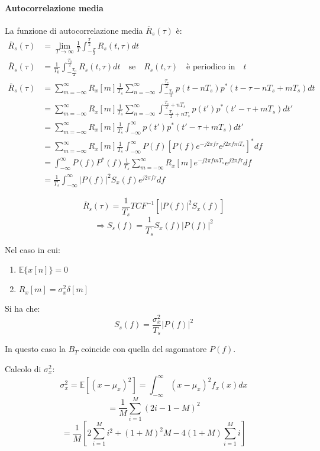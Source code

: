 \documentclass{article}
\begin{document}
\paragraph*{Autocorrelazione media}

La funzione di autocorrelazione media \( \overline{R}_s(\tau) \) è:
\begin{align*}
\overline{R}_s(\tau) &= \lim_{T\to\infty} \frac{1}{T} \int_{-\frac{T}{2}}^{\frac{T}{2}} R_s(t, \tau) dt \\
\overline{R}_s(\tau) &= \frac{1}{T_0} \int_{-\frac{T_0}{2}}^{\frac{T_0}{2}} R_s(t,\tau)dt \quad \text{se} \quad R_s(t,\tau) \quad \text{è periodico in} \quad t \\
\overline{R}_s(\tau) &= \sum_{m=-\infty}^{\infty} R_x[m] \frac{1}{T_s} \sum_{n=-\infty}^{\infty} \int_{-\frac{T_s}{2}}^{\frac{T_s}{2}} p(t-nT_s)p^*(t-\tau-nT_s+mT_s)dt \\
&= \sum_{m=-\infty}^{\infty} R_x[m] \frac{1}{T_s} \sum_{n=-\infty}^{\infty}\int_{-\frac{T_s}{2}+nT_s}^{\frac{T_s}{2}+nT_s} p(t')p^*(t'-\tau+mT_s)dt' \\
&= \sum_{m=-\infty}^{\infty} R_x[m] \frac{1}{T_s} \int_{-\infty}^{\infty} p(t')p^*(t'-\tau+mT_s)dt' \\
&= \sum_{m=-\infty}^{\infty} R_x[m] \frac{1}{T_s} \int_{-\infty}^{\infty} P(f)[P(f)e^{-j2\pi f\tau}e^{j2\pi fmT_s}]^*df \\
&= \int_{-\infty}^{\infty} P(f)P^*(f)\frac{1}{T_s} \sum_{m=-\infty}^{\infty} R_x[m] e^{-j2\pi fmT_s}e^{j2\pi f\tau}df \\
&= \frac{1}{T_s} \int_{-\infty}^{\infty} |P(f)|^2 S_x(f)e^{j2\pi f\tau}df
\end{align*}


\[
\overline{R}_s(\tau) = \frac{1}{T_s} TCF^{-1} \left[ |P(f)|^2 S_x(f) \right]
\]
\[
\Rightarrow S_s(f) = \frac{1}{T_s} S_x(f) |P(f)|^2
\]

Nel caso in cui:
\begin{enumerate}
  \item $\mathbb{E} \{ x[n] \} = 0$
  \item $R_x[m] = \sigma_x^2 \delta[m]$
\end{enumerate}

Si ha che:
\[
S_s(f) = \frac{\sigma_x^2}{T_s} |P(f)|^2
\]

In questo caso la $B_T$ coincide con quella del sagomatore $P(f)$.

Calcolo di $\sigma_x^2$:
\[
\sigma_x^2 = \mathbb{E} \left[ (x - \mu_x)^2 \right] = \int_{-\infty}^{\infty} (x - \mu_x)^2 f_x(x) dx
\]
\[
= \frac{1}{M} \sum_{i=1}^{M} (2i - 1 - M)^2
\]
\[
= \frac{1}{M} \left[ 2 \sum_{i=1}^{M} i^2 + (1+M)^2 M - 4(1+M) \sum_{i=1}^{M} i \right]
\]
\end{document}

